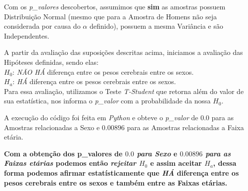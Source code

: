 \documentclass[12pt, a4paper]{article}
\begin{document}
    \begin{table}[]
    \caption{Avaliação das Suposições}
    \label{tab:exe1}
    \end{table}
    \break
    
    Com os \textit{p\_valores} descobertos, assumimos que \textbf{sim} as amostras possuem Distribuição Normal (mesmo que para a Amostra de Homens não seja considerada por causa do $\alpha$ definido), possuem a mesma Variância e são Independentes.
    
    A partir da avaliação das suposições descritas acima, iniciamos a avaliação das Hipóteses definidas, sendo elas:\\
    
    $H_{0}$: \textit{NÃO HÁ} diferença entre os pesos cerebrais entre os sexos.\\
    $H_{a}$: \textit{HÁ} diferença entre os pesos cerebrais entre os sexos.\\
	
	Para essa avaliação, utilizamos o Teste \textit{T-Student} que retorna além do valor de sua estatística, nos informa o \textit{p\_valor} com a probabilidade da nossa $H_{0}$.
	
	A execução do código foi feita em \textit{Python} e obteve o \textit{p\_valor} de \underline{\textbf{$0.0$}} para as Amostras relacionadas a Sexo e \underline{\textbf{$0.00896$}} para as Amostras relacionadas a Faixa etária.
	
	\textbf{Com a obtenção dos p\_valores de \emph{$0.0$ para Sexo} e \emph{$0.00896$ para as Faixas etárias} podemos então \emph{rejeitar $H_{0}$} e assim aceitar \emph{$H_{a}$}, dessa forma podemos afirmar estatísticamente que \emph{HÁ} diferença entre os pesos cerebrais entre os sexos e também entre as Faixas etárias.}
	
\end{document}
